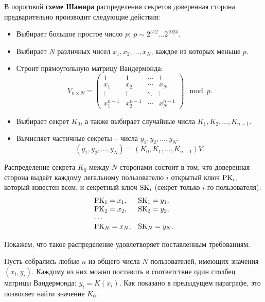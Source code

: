 В пороговой \textbf{схеме Шамира} распределения секретов доверенная сторона предварительно производит следующие действия:
\begin{itemize}
    \item Выбирает большое простое число $p: ~ p \sim 2^{512} \dots 2^{1024}$.
    \item Выбирает $N$ различных чисел $x_1, x_2, \dots, x_N$, каждое из которых меньше $p$.
    \item Строит прямоугольную матрицу Вандермонда:
        \[
            V_{n \times N} = \left( \begin{array}{cccc}
                {1} & {1} & { \cdots } & {1} \\
                {x_{1} } & {x_{2} } & { \cdots } & {x_{N} } \\
                { \vdots } & { \vdots } & { \ddots } & { \vdots } \\
                {x_{1}^{n-1} } & {x_{2}^{n-1} } & { \cdots } & {x_{N}^{n-1} }
            \end{array} \right) \mod p.
        \]
    \item Выбирает секрет $K_0$, а также выбирает случайные числа $K_1, K_2, \dots, K_{n-1}$.
    \item Вычисляет частичные секреты -- числа $y_1, y_2, \dots, y_N$:
        \[ (y_1, y_2, \dots, y_N) = (K_0, K_1, \dots, K_{n-1}) V. \]
\end{itemize}

Распределение секрета $K_0$ между $N$ сторонами состоит в том, что доверенная сторона выдаёт каждому легальному пользователю $i$ открытый ключ $\textrm{PK}_i$, который известен всем, и секретный ключ $\textrm{SK}_i$ (секрет только $i$-го пользователя):
\[ \begin{array}{ll}
    \textrm{PK}_1 = x_1, & \textrm{SK}_1 = y_1, \\
    \textrm{PK}_2 = x_2, & \textrm{SK}_2 = y_2, \\
    \cdots & \\
    \textrm{PK}_N = x_N, & \textrm{SK}_N = y_N. \\
\end{array} \]

Покажем, что такое распределение удовлетворяет поставленным требованиям.

Пусть собрались любые $n$ из общего числа $N$ пользователей, имеющих значения $(x_i, y_i)$. Каждому из них можно поставить в соответствие один столбец матрицы Вандермонда: $y_i = K(x_i)$. Как показано в предыдущем параграфе, это позволяет найти значение $K_0$.

